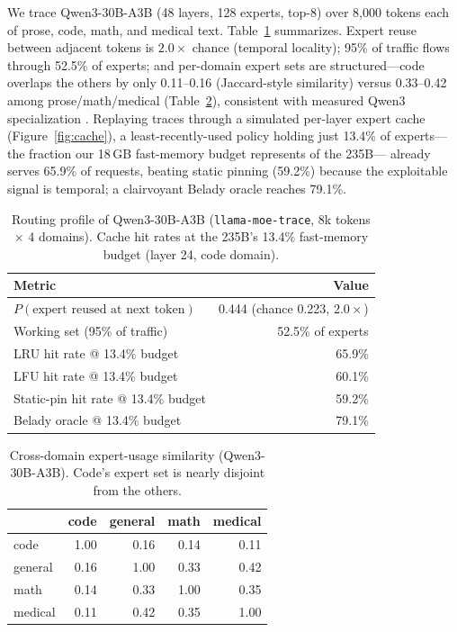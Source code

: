 \documentclass[11pt]{article}
\begin{document}
We trace Qwen3-30B-A3B (48 layers, 128 experts, top-8) over 8{,}000 tokens each
of prose, code, math, and medical text. Table~\ref{tab:profile} summarizes.
Expert reuse between adjacent tokens is $2.0\times$ chance (temporal locality);
95\% of traffic flows through 52.5\% of experts; and per-domain expert sets are
structured---code overlaps the others by only 0.11--0.16 (Jaccard-style
similarity) versus 0.33--0.42 among prose/math/medical
(Table~\ref{tab:domain}), consistent with measured Qwen3 specialization
\citep{dai2024deepseekmoe}. Replaying traces through a simulated per-layer expert cache
(Figure~\ref{fig:cache}), a least-recently-used policy holding just 13.4\% of
experts---the fraction our 18\,GB fast-memory budget represents of the 235B---
already serves 65.9\% of requests, beating static pinning (59.2\%) because the
exploitable signal is temporal; a clairvoyant Belady oracle reaches 79.1\%.

\begin{table}[t]\centering
\caption{Routing profile of Qwen3-30B-A3B (\texttt{llama-moe-trace}, 8k tokens
$\times$ 4 domains). Cache hit rates at the 235B's 13.4\% fast-memory budget
(layer 24, code domain).}
\label{tab:profile}
\small
\begin{tabular}{lr}
\toprule
Metric & Value \\
\midrule
$P(\text{expert reused at next token})$ & 0.444 \;(chance 0.223, $2.0\times$) \\
Working set (95\% of traffic) & 52.5\% of experts \\
LRU hit rate @ 13.4\% budget & 65.9\% \\
LFU hit rate @ 13.4\% budget & 60.1\% \\
Static-pin hit rate @ 13.4\% budget & 59.2\% \\
Belady oracle @ 13.4\% budget & 79.1\% \\
\bottomrule
\end{tabular}
\end{table}

\begin{table}[t]\centering
\caption{Cross-domain expert-usage similarity (Qwen3-30B-A3B). Code's expert set
is nearly disjoint from the others.}
\label{tab:domain}
\small
\begin{tabular}{lrrrr}
\toprule
 & code & general & math & medical \\
\midrule
code    & 1.00 & 0.16 & 0.14 & 0.11 \\
general & 0.16 & 1.00 & 0.33 & 0.42 \\
math    & 0.14 & 0.33 & 1.00 & 0.35 \\
medical & 0.11 & 0.42 & 0.35 & 1.00 \\
\bottomrule
\end{tabular}
\end{table}
\end{document}
